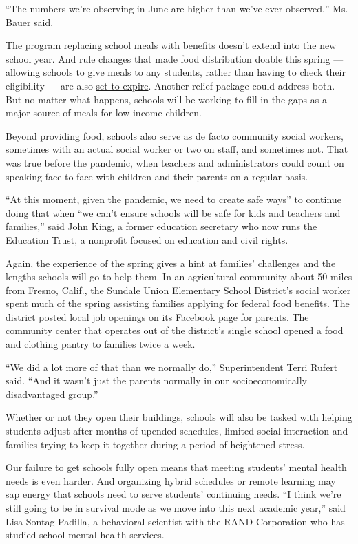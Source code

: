 ``The numbers we're observing in June are higher than we've ever
observed,'' Ms. Bauer said.

The program replacing school meals with benefits doesn't extend into the
new school year. And rule changes that made food distribution doable
this spring --- allowing schools to give meals to any students, rather
than having to check their eligibility --- are also
\href{https://www.politico.com/news/2020/07/20/millions-of-kids-may-lose-out-on-free-meals-as-they-return-to-school-374587}{set
to expire}. Another relief package could address both. But no matter
what happens, schools will be working to fill in the gaps as a major
source of meals for low-income children.

Beyond providing food, schools also serve as de facto community social
workers, sometimes with an actual social worker or two on staff, and
sometimes not. That was true before the pandemic, when teachers and
administrators could count on speaking face-to-face with children and
their parents on a regular basis.

``At this moment, given the pandemic, we need to create safe ways'' to
continue doing that when ``we can't ensure schools will be safe for kids
and teachers and families,'' said John King, a former education
secretary who now runs the Education Trust, a nonprofit focused on
education and civil rights.

Again, the experience of the spring gives a hint at families' challenges
and the lengths schools will go to help them. In an agricultural
community about 50 miles from Fresno, Calif., the Sundale Union
Elementary School District's social worker spent much of the spring
assisting families applying for federal food benefits. The district
posted local job openings on its Facebook page for parents. The
community center that operates out of the district's single school
opened a food and clothing pantry to families twice a week.

``We did a lot more of that than we normally do,'' Superintendent Terri
Rufert said. ``And it wasn't just the parents normally in our
socioeconomically disadvantaged group.''

Whether or not they open their buildings, schools will also be tasked
with helping students adjust after months of upended schedules, limited
social interaction and families trying to keep it together during a
period of heightened stress.

Our failure to get schools fully open means that meeting students'
mental health needs is even harder. And organizing hybrid schedules or
remote learning may sap energy that schools need to serve students'
continuing needs. ``I think we're still going to be in survival mode as
we move into this next academic year,'' said Lisa Sontag-Padilla, a
behavioral scientist with the RAND Corporation who has studied school
mental health services.

